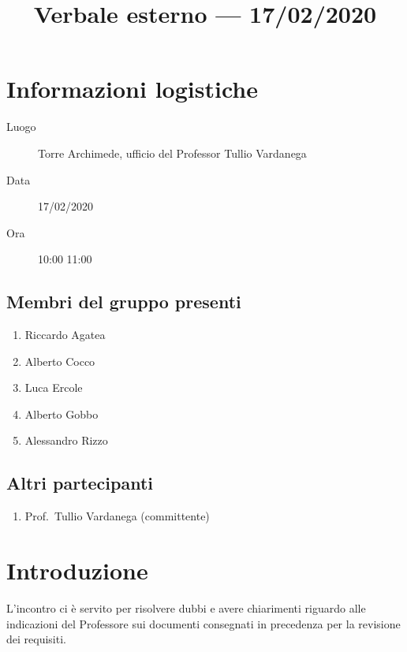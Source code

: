 \documentclass{article}
\title{Verbale esterno --- 17/02/2020}
\begin{document}


\section{Informazioni logistiche}%
\label{sec:informazioni_logistiche}

\begin{description}
  \item [Luogo] Torre Archimede, ufficio del Professor Tullio Vardanega
  \item [Data] 17/02/2020
  \item [Ora] 10:00  11:00
\end{description}

\subsection{Membri del gruppo presenti}%
\label{sub:membri_del_gruppo_presenti}

\begin{enumerate}
  \item Riccardo Agatea
  \item Alberto Cocco
  \item Luca Ercole
  \item Alberto Gobbo
  \item Alessandro Rizzo
\end{enumerate}

\subsection{Altri partecipanti}%
\label{sub:altri_partecipanti}
\begin{enumerate}
  \item Prof.\ Tullio Vardanega (committente)
\end{enumerate}


\section{Introduzione}%
\label{sec:introduzione}

L'incontro ci è servito per risolvere dubbi e avere chiarimenti riguardo alle indicazioni del Professore sui documenti consegnati in precedenza per la revisione dei requisiti.
\end{document}
